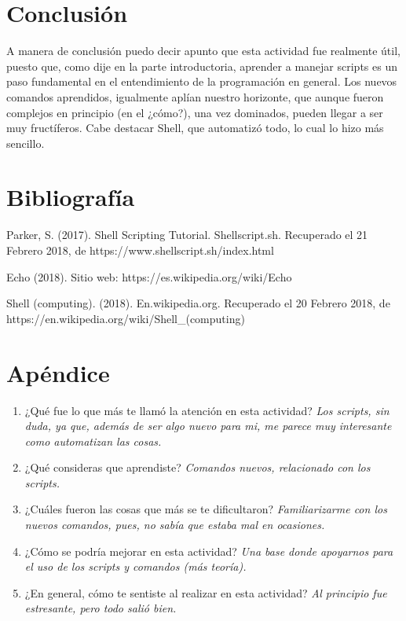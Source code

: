 \documentclass{article}
\begin{document}
\begin{doublespace}
\begin{itemize}
\section{Conclusión}
A manera de conclusión puedo decir apunto que esta actividad fue realmente útil, puesto que, como dije en la parte introductoria, aprender a manejar scripts es un paso fundamental en el entendimiento de la programación en general. Los nuevos comandos aprendidos, igualmente aplían nuestro horizonte, que aunque fueron complejos en principio (en el ¿cómo?), una vez dominados, pueden llegar a ser muy fructíferos. Cabe destacar Shell, que automatizó todo, lo cual lo hizo más sencillo.

\section{Bibliografía}
Parker, S. (2017). Shell Scripting Tutorial. Shellscript.sh. Recuperado el
21 Febrero 2018, de https://www.shellscript.sh/index.html

Echo (2018). Sitio web:
https://es.wikipedia.org/wiki/Echo

Shell (computing). (2018). En.wikipedia.org. Recuperado el 20 Febrero
2018, de https://en.wikipedia.org/wiki/Shell\_(computing)



\section{Apéndice}
\begin{enumerate}
\item ¿Qué fue lo que más te llamó la atención en esta actividad?
\textit{Los scripts, sin duda, ya que, además de ser algo nuevo para mi, me parece muy interesante como automatizan las cosas.}

\item ¿Qué consideras que aprendiste?
\textit{Comandos nuevos, relacionado con los scripts.}

\item ¿Cuáles fueron las cosas que más se te dificultaron?
\textit{Familiarizarme con los nuevos comandos, pues, no sabía que estaba mal en ocasiones.}

\item ¿Cómo se podría mejorar en esta actividad?
\textit{Una base donde apoyarnos para el uso de los scripts y comandos (más teoría).}

\item ¿En general, cómo te sentiste al realizar en esta actividad? 
\textit{Al principio fue estresante, pero todo salió bien.}


\end{enumerate}



\end{itemize}
\end{doublespace}
\end{document}
